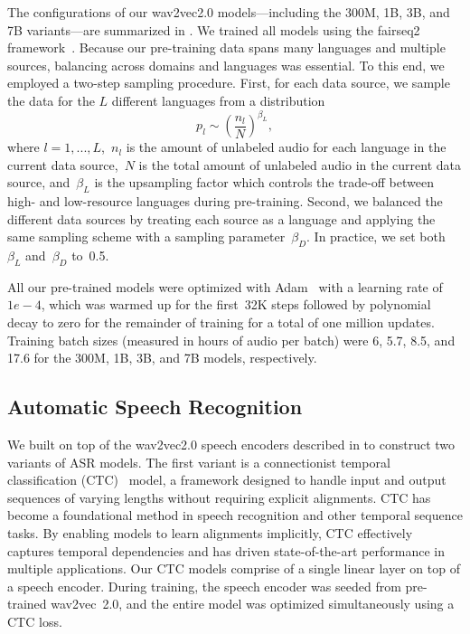 \documentclass[]{fairmeta}
\begin{document}
The configurations of our wav2vec2.0 models—including the 300M, 1B, 3B, and 7B variants—are summarized in . We trained all models using the fairseq2 framework~\citep{balioglu2023fairseq2}. Because our pre-training data spans many languages and multiple sources, balancing across domains and languages was essential. To this end, we employed a two-step sampling procedure. First, for each data source, we sample the data for the $L$ different languages from a distribution
\begin{equation}
\label{eq:betas}
p_l \sim \left(\frac{n_l}{N}\right)^{\beta_{L}},
\end{equation}
where $l = 1, . . . , L$,~$n_l$ is the amount of unlabeled audio for each language in the current data source,~$N$ is the total amount of unlabeled audio in the current data source, and~$\beta_L$ is the upsampling factor which controls the trade-off between high- and low-resource languages during pre-training.  Second, we balanced the different data sources by treating each source as a language and applying the same sampling scheme with a sampling parameter~$\beta_D$.  In practice, we set both~$\beta_L$ and~$\beta_D$ to~0.5.  

All our pre-trained models were optimized with Adam~\citep{kingma2014adam} with a learning rate of~$1e-4$, which was warmed up for the first~32K steps followed by polynomial decay to zero for the remainder of training for a total of one million updates. Training batch sizes (measured in hours of audio per batch) were 6, 5.7, 8.5, and 17.6 for the 300M, 1B, 3B, and 7B models, respectively.

\subsection{Automatic Speech Recognition}
\label{sec:asr_methods}

We built on top of the wav2vec2.0 speech encoders described in  to construct two variants of ASR models. The first variant is a connectionist temporal classification (CTC)~\citep{graves2006connectionist} model, a framework designed to handle input and output sequences of varying lengths without requiring explicit alignments. CTC has become a foundational method in speech recognition and other temporal sequence tasks. By enabling models to learn alignments implicitly, CTC effectively captures temporal dependencies and has driven state-of-the-art performance in multiple applications. Our CTC models comprise of a single linear layer on top of a speech encoder. During training, the speech encoder was seeded from pre-trained wav2vec~2.0, and the entire model was optimized simultaneously using a CTC loss.
\end{document}
